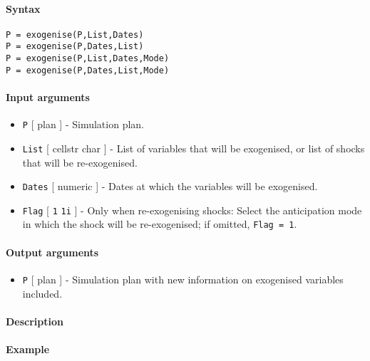 


	\paragraph{Syntax}\label{syntax}

\begin{verbatim}
P = exogenise(P,List,Dates)
P = exogenise(P,Dates,List)
P = exogenise(P,List,Dates,Mode)
P = exogenise(P,Dates,List,Mode)
\end{verbatim}

\paragraph{Input arguments}\label{input-arguments}

\begin{itemize}
\item
  \texttt{P} {[} plan {]} - Simulation plan.
\item
  \texttt{List} {[} cellstr \textbar{} char {]} - List of variables that
  will be exogenised, or list of shocks that will be re-exogenised.
\item
  \texttt{Dates} {[} numeric {]} - Dates at which the variables will be
  exogenised.
\item
  \texttt{Flag} {[} \texttt{1} \textbar{} \texttt{1i} {]} - Only when
  re-exogenising shocks: Select the anticipation mode in which the shock
  will be re-exogenised; if omitted, \texttt{Flag = 1}.
\end{itemize}

\paragraph{Output arguments}\label{output-arguments}

\begin{itemize}
\itemsep1pt\parskip0pt
\item
  \texttt{P} {[} plan {]} - Simulation plan with new information on
  exogenised variables included.
\end{itemize}

\paragraph{Description}\label{description}

\paragraph{Example}\label{example}


